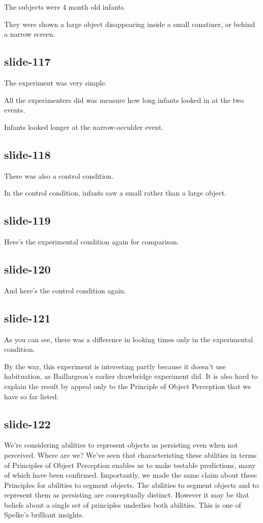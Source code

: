\documentclass[12pt,\papersize]{extarticle}
\begin{document}
The subjects were 4 month old infants.
 
They were shown a large object disappearing inside a small conatiner, or behind a narrow screen.
 
\subsection{slide-117}
The experiment was very simple.
 
All the experimenters did was measure how long infants looked in at the two events.
 
Infants looked longer at the narrow-occulder event.
 
\subsection{slide-118}
There was also a control condition.
 
In the control condition, infants saw a small rather than a large object.
 
\subsection{slide-119}
Here’s the experimental condition again for comparison.
 
\subsection{slide-120}
And here's the control condition again.
 
\subsection{slide-121}
As you can see, there was a difference in looking times only in the experimental condition.
 
By the way, this experiment is interesting partly because it doesn't use habituation, as 
Baillargeon's earlier drawbridge experiment did.
It is also hard to explain the result by appeal only to the Principle of Object Perception
that we have so far listed.
 
\subsection{slide-122}
We're considering abilities to represent objects as persisting even when not perceived. 
Where are we?
We've seen that characteristing these abilities in terms of Principles of Object Perception
enables us to make testable predictions, many of which have been confirmed.
Importantly, we made the same claim about these Principles for abilities to segment objects.
The abilities to segment objects and to represent them as persisting are conceptually 
distinct.
However it may be that beliefs about a single set of principles underlies both abilities.
This is one of Spelke's brilliant insights.
 
\end{document}
